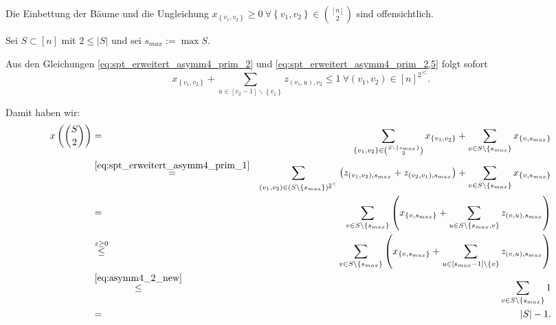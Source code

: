 \documentclass[10p,a4paper,BCOR = 12mm, DIV=15]{scrbook}
\begin{document}
{\begin{bew}
Die Einbettung der Bäume und die Ungleichung $x_{\left\{v_1, v_2\right\}} \geq 0 \ \forall \left\{v_1, v_2\right\} \in {\left[n\right] \choose 2}$ sind offensichtlich.

Sei $S \subset \left[n\right]$ mit $2 \leq \left|S\right|$ und sei $s_{max} := \max S$.

Aus den Gleichungen \eqref{eq:spt_erweitert_asymm4_prim_2} und \eqref{eq:spt_erweitert_asymm4_prim_2,5} folgt sofort
\begin{equation}
x_{\left\{v_1, v_2\right\}} + \sum_{u\in[v_2-1]\backslash\left\{v_1\right\}} z_{\left(v_1, u\right), v_2} \leq 1\ \forall \left(v_1, v_2\right)\in {[n]^{\underline{2}}}^<. \label{eq:asymm4_2_new}
\end{equation}

Damit haben wir:
{
\allowdisplaybreaks
\begin{eqnarray*}
x\left({S \choose 2}\right) & = & \sum_{\left\{v_1, v_2\right\} \in {S \backslash \left\{s_{max}\right\} \choose 2}} x_{\left\{v_1, v_2\right\}} + \sum_{v \in S \backslash \left\{s_{max}\right\}} x_{\left\{v, s_{max}\right\}} \\
& \stackrel{\eqref{eq:spt_erweitert_asymm4_prim_1}}{=} & \sum_{\left(v_1, v_2\right) \in \left(S \backslash \left\{s_{max}\right\}\right)^{\underline{2}^<}} \left(z_{\left(v_1, v_2\right), s_{max}} + z_{\left(v_2, v_1\right), s_{max}}\right) + \sum_{v \in S \backslash \left\{s_{max}\right\}} x_{\left\{v, s_{max}\right\}} \\
& = & \sum_{v \in S \backslash \left\{s_{max}\right\}} \left(x_{\left\{v, s_{max}\right\}} + \sum_{u \in S \backslash \left\{s_{max}, v\right\}} z_{\left(v, u\right), s_{max}}\right) \\
& \stackrel{z \geq 0}{\leq} & \sum_{v \in S \backslash \left\{s_{max}\right\}} \left(x_{\left\{v, s_{max}\right\}} + \sum_{u \in \left[s_{max}-1\right] \backslash \left\{v\right\}} z_{\left(v, u\right), s_{max}}\right) \\
& \stackrel{\eqref{eq:asymm4_2_new}}{\leq} & \sum_{v \in S \backslash \left\{s_{max}\right\}} 1 \\
& = & \left|S\right| - 1.
\end{eqnarray*}
}


\end{bew}}
\end{document}
